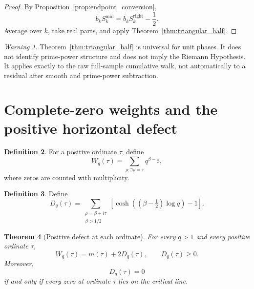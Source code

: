 \documentclass[11pt]{amsart}
\numberwithin{equation}{section}
\theoremstyle{plain}
\newtheorem{theorem}{Theorem}[section]
\theoremstyle{definition}
\newtheorem{definition}[theorem]{Definition}
\theoremstyle{remark}
\newtheorem{warning}[theorem]{Warning}
\newcommand{\1}{\mathbf{1}}
\begin{document}
\begin{proof}
By Proposition~\ref{prop:endpoint_conversion},
\begin{equation}
\overline b_kS_k^{\mathrm{mid}}
=
\overline b_kS_k^{\mathrm{right}}-\frac12.
\label{eq:midpoint_corollary_step}
\end{equation}
Average over \(k\), take real parts, and apply
Theorem~\ref{thm:triangular_half}.
\end{proof}

\begin{warning}
\label{warn:triangular_scope}
Theorem~\ref{thm:triangular_half} is universal for unit phases.  It does
not identify prime-power structure and does not imply the Riemann
Hypothesis.  It applies exactly to the raw full-sample cumulative walk,
not automatically to a residual after smooth and prime-power subtraction.
\end{warning}

\section{Complete-zero weights and the positive horizontal defect}
\label{sec:positive_defect}

\begin{definition}
\label{def:complete_zero_weight}
For a positive ordinate \(\tau\), define
\begin{equation}
W_q(\tau)
=
\sum_{\rho:\Im\rho=\tau}
q^{\beta-\frac12},
\label{eq:Wq_definition}
\end{equation}
where zeros are counted with multiplicity.
\end{definition}

\begin{definition}
\label{def:Dq}
Define
\begin{equation}
D_q(\tau)
=
\sum_{\substack{\rho=\beta+i\tau\\\beta>1/2}}
\left[
\cosh\left((\beta-\tfrac12)\log q\right)-1
\right].
\label{eq:Dq_definition}
\end{equation}
\end{definition}

\begin{theorem}[Positive defect at each ordinate]
\label{thm:positive_defect}
For every \(q>1\) and every positive ordinate \(\tau\),
\begin{equation}
\boxed{
W_q(\tau)=m(\tau)+2D_q(\tau),
\qquad
D_q(\tau)\geq0.
}
\label{eq:W_m_D}
\end{equation}
Moreover,
\begin{equation}
D_q(\tau)=0
\label{eq:Dq_zero_condition}
\end{equation}
if and only if every zero at ordinate \(\tau\) lies on the critical line.
\end{theorem}
\end{document}
